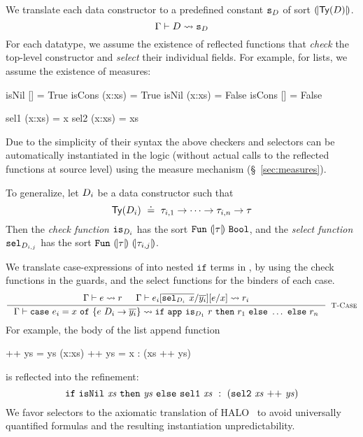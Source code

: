 %
We translate each data constructor to a
predefined \smtlan constant ${\texttt{s}_{D}}$ of
sort ${(\!|\mathsf{Ty}({D})|\!)}$.
$$
	 \Gamma\vdash D \rightsquigarrow \texttt{s}_{D} 
$$
%
For each datatype, we assume the existence of reflected functions that
\emph{check} the top-level constructor
and \emph{select} their individual fields.
%
For example, for lists, we assume the existence of measures:
%
\begin{mcode}
  isNil []     = True     isCons (x:xs) = True
  isNil (x:xs) = False    isCons []     = False

  sel1 (x:xs)  = x        sel2 (x:xs)   = xs
\end{mcode}
%
Due to the simplicity of their syntax the above checkers and selectors
can be automatically instantiated in the logic
(\ie without actual calls to the reflected functions at source level)
using the measure mechanism (\S~\ref{sec:measures}).

To generalize, let $D_i$ be a data constructor such that
$$
\mathsf{Ty}({D_i}) \ \doteq\  \tau_{i,1} \rightarrow \dots \rightarrow \tau_{i,n} \rightarrow \tau
$$
Then the \emph{check function}
${\texttt{is}_{{D_i}}}$ has the sort
$\mathtt{Fun}\ {(\!|\tau|\!)}\ {\texttt{Bool}}$,
and the \emph{select function}
${\texttt{sel}_{{D}_{i,j}}}$ has the sort
$\mathtt{Fun}\ {(\!|\tau|\!)}\ {(\!|\tau_{i,j}|\!)}$.
%


%
We translate case-expressions
of \corelan into nested $\mathtt{if}$
terms in \smtlan, by using the check
functions in the guards, and the
select functions for the binders
of each case.
$$
\inference{
	\tologicshort{\env}{e}{\typ_e}{\pred}{\embed{\typ_e}}{\smtenv}{\axioms} &&
	\tologicshort{\env}{e_i\subst{\overline{y_i}}{\overline{\selector{\dc_i}{}\ x}}\subst{x}{e}}{\typ}{\pred_i}{\embed{\typ}}{\smtenv}{\axioms_i}
}{
	\tologicshort{\env}{\ecase{x}{e}{\dc_i}{\overline{y_i}}{e_i}}{\typ}
	 {\eif{\smtappname{}{}\ \checkdc{\dc_1}\ \pred}{\pred_1}{\ldots} \ \mathtt{else}\ \pred_n}{\embed{\typ}}{\smtenv}
	 {\andaxioms{\axioms}{\axioms_i}}
}[\lgcase]
$$
%
For example, the body of the list append function
%
\begin{code}
  []     ++ ys = ys
  (x:xs) ++ ys = x : (xs ++ ys)
\end{code}
%
is reflected into the \smtlan refinement:
%
$$
\ite{\mathtt{isNil}\ \mathit{xs}}
    {\mathit{ys}}
    {\mathtt{sel1}\ \mathit{xs}\
       \dcons\
       (\mathtt{sel2}\ \mathit{xs} \ \mathtt{++}\  \mathit{ys})}
$$
%
We favor selectors to the axiomatic translation of
HALO~\citep{halo} to avoid
universally quantified formulas and the resulting
instantiation unpredictability.



